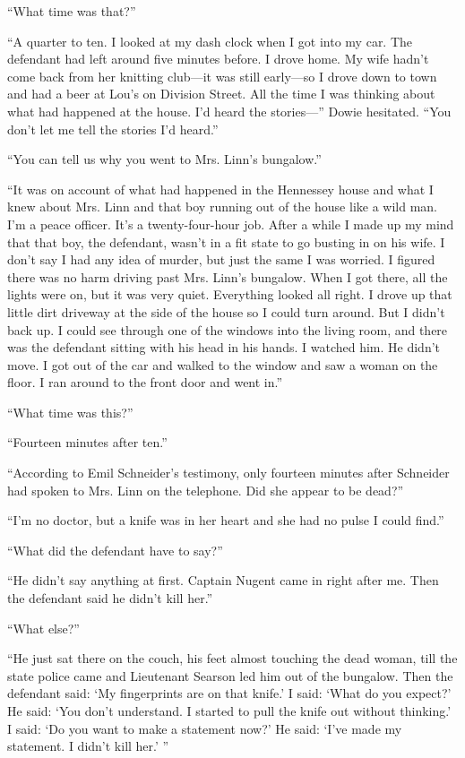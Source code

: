 \documentclass{novel}
\begin{document}
{“What time was that?”

“A quarter to ten. I looked at my dash clock when I got into my car. The defendant had left around five minutes before. I drove home. My wife hadn’t come back from her knitting club—it was still early—so I drove down to town and had a beer at Lou’s on Division Street. All the time I was thinking about what had happened at the house. I’d heard the stories—” Dowie hesitated. “You don’t let me tell the stories I’d heard.”

“You can tell us why you went to Mrs. Linn’s bungalow.”

“It was on account of what had happened in the Hennessey house and what I knew about Mrs. Linn and that boy running out of the house like a wild man. I’m a peace officer. It’s a twenty-four-hour job. After a while I made up my mind that that boy, the defendant, wasn’t in a fit state to go busting in on his wife. I don’t say I had any idea of murder, but just the same I was worried. I figured there was no harm driving past Mrs. Linn’s bungalow. When I got there, all the lights were on, but it was very quiet. Everything looked all right. I drove up that little dirt driveway at the side of the house so I could turn around. But I didn’t back up. I could see through one of the windows into the living room, and there was the defendant sitting with his head in his hands. I watched him. He didn’t move. I got out of the car and walked to the window and saw a woman on the floor. I ran around to the front door and went in.”

“What time was this?”

“Fourteen minutes after ten.”

“According to Emil Schneider’s testimony, only fourteen minutes after Schneider had spoken to Mrs. Linn on the telephone. Did she appear to be dead?”

“I’m no doctor, but a knife was in her heart and she had no pulse I could find.”

“What did the defendant have to say?”

“He didn’t say anything at first. Captain Nugent came in right after me. Then the defendant said he didn’t kill her.”

“What else?”

“He just sat there on the couch, his feet almost touching the dead woman, till the state police came and Lieutenant Searson led him out of the bungalow. Then the defendant said: ‘My fingerprints are on that knife.’ I said: ‘What do you expect?’ He said: ‘You don’t understand. I started to pull the knife out without thinking.’ I said: ‘Do you want to make a statement now?’ He said: ‘I’ve made my statement. I didn’t kill her.’ ”

}
\end{document}

